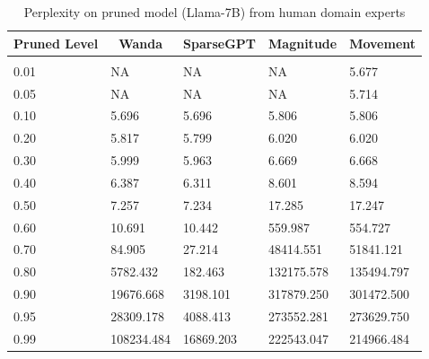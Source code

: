 \documentclass{article} %
\begin{document}
\begin{table}[t]
\caption{Perplexity on pruned model (Llama-7B) from human domain experts}
\label{table-1}
\begin{center}
\begin{tabular}{lllll}
\multicolumn{1}{c}{\bf Pruned Level}  &\multicolumn{1}{c}{\bf Wanda} &\multicolumn{1}{c}{\bf SparseGPT} &\multicolumn{1}{c}{\bf Magnitude} &\multicolumn{1}{c}{\bf Movement}
\\ \hline \\
0.01         &NA &NA & NA & 5.677 \\
0.05         &NA &NA & NA & 5.714 \\
0.10         &5.696 &5.696 & 5.806 & 5.806 \\
0.20         &5.817 &5.799 & 6.020 & 6.020 \\
0.30         &5.999 &5.963 & 6.669 & 6.668 \\
0.40         &6.387 &6.311 & 8.601 & 8.594 \\
0.50         &7.257 &7.234	& 17.285 & 17.247 \\
0.60         &10.691 &10.442 & 559.987 & 554.727 \\
0.70         &84.905 &27.214 & 48414.551 & 51841.121 \\
0.80         &5782.432 &182.463 & 132175.578 & 135494.797 \\
0.90         &19676.668 &3198.101 & 317879.250 & 301472.500 \\
0.95         &28309.178 &4088.413 & 273552.281 & 273629.750 \\
0.99         &108234.484 &16869.203 & 222543.047 & 214966.484 \\
\end{tabular}
\end{center}
\end{table}
\end{document}
